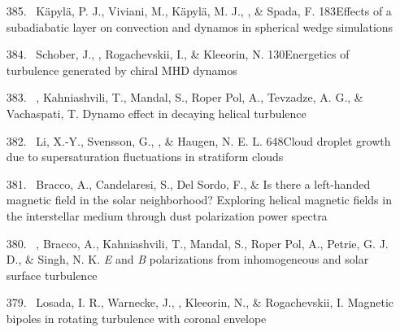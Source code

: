 \begin{itemize}
\item[{385.}~]
K\"apyl\"a, P. J., Viviani, M., K\"apyl\"a, M. J., \Brandenburg, \& Spada, F.
{183}{Effects of a subadiabatic layer on convection and dynamos in spherical wedge simulations}

\item[{384.}~]
Schober, J., \Brandenburg, Rogachevskii, I., \& Kleeorin, N.
{130}{Energetics of turbulence generated by chiral MHD dynamos}

\item[{383.}~]
\Brandenburg, Kahniashvili, T., Mandal, S., Roper Pol, A., Tevzadze, A. G., \& Vachaspati, T.
{Dynamo effect in decaying helical turbulence}

\item[{382.}~]
Li, X.-Y., Svensson, G., \Brandenburg, \& Haugen, N. E. L.
{648}{Cloud droplet growth due to supersaturation fluctuations in stratiform clouds}

\item[{381.}~]
Bracco, A., Candelaresi, S., Del Sordo, F., \& \Brandenburg{}
{Is there a left-handed magnetic field in the solar neighborhood? Exploring helical magnetic fields in the interstellar medium through dust polarization power spectra}

\item[{380.}~]
\Brandenburg, Bracco, A., Kahniashvili, T., Mandal, S., Roper Pol, A., Petrie, G. J. D., \& Singh, N. K.
{{\em E} and {\em B} polarizations from inhomogeneous and solar surface turbulence}

\item[{379.}~]
Losada, I. R., Warnecke, J., \Brandenburg, Kleeorin, N., \& Rogachevskii, I.
{Magnetic bipoles in rotating turbulence with coronal envelope}


\end{itemize}

